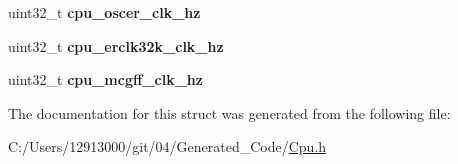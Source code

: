 \begin{DoxyCompactItemize}
\item 
\hypertarget{struct_t_cpu_clock_configuration_a8573f3896f85f97201ef2d6252d99905}{}uint32\+\_\+t {\bfseries cpu\+\_\+oscer\+\_\+clk\+\_\+hz}\label{struct_t_cpu_clock_configuration_a8573f3896f85f97201ef2d6252d99905}

\item 
\hypertarget{struct_t_cpu_clock_configuration_a3f68e3893f7dec551e938a909929687b}{}uint32\+\_\+t {\bfseries cpu\+\_\+erclk32k\+\_\+clk\+\_\+hz}\label{struct_t_cpu_clock_configuration_a3f68e3893f7dec551e938a909929687b}

\item 
\hypertarget{struct_t_cpu_clock_configuration_a5bd9b1235d0f85073ed01c126782d898}{}uint32\+\_\+t {\bfseries cpu\+\_\+mcgff\+\_\+clk\+\_\+hz}\label{struct_t_cpu_clock_configuration_a5bd9b1235d0f85073ed01c126782d898}

\end{DoxyCompactItemize}


The documentation for this struct was generated from the following file\+:\begin{DoxyCompactItemize}
\item 
C\+:/\+Users/12913000/git/04/\+Generated\+\_\+\+Code/\hyperlink{_cpu_8h}{Cpu.\+h}\end{DoxyCompactItemize}
